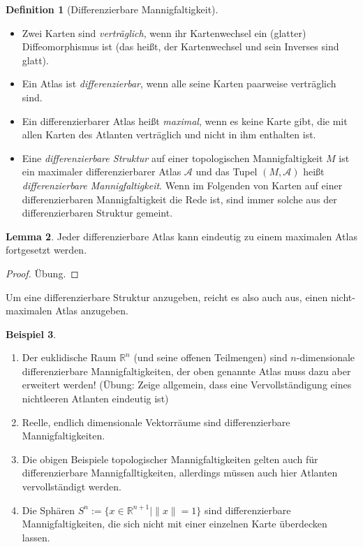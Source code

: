 \documentclass[a4paper]{scrreprt}
\numberwithin{equation}{chapter}
\newcommand{\R}{\mathbb{R}}
\theoremstyle{definition}
\newtheorem{defn}{Definition}[section]
\newtheorem{lemma}[defn]{Lemma}
\newtheorem{bsp}[defn]{Beispiel}
\newcommand{\bewUeb}{\begin{proof}Übung.\end{proof}}
\begin{document}
		\begin{defn}[Differenzierbare Mannigfaltigkeit]\hfill
			\begin{itemize}
				\item Zwei Karten sind \emph{verträglich}, wenn ihr Kartenwechsel ein (glatter) Diffeomorphismus ist (das heißt, der Kartenwechsel und sein Inverses sind glatt).
				\item Ein Atlas ist \emph{differenzierbar}, wenn alle seine Karten paarweise verträglich sind.
				\item Ein differenzierbarer Atlas heißt \emph{maximal}, wenn es keine Karte gibt, die mit allen Karten des Atlanten verträglich und nicht in ihm enthalten ist.
				\item Eine \emph{differenzierbare Struktur} auf einer topologischen Mannigfaltigkeit $M$ ist ein maximaler differenzierbarer Atlas $\mathcal{A}$ und das Tupel $(M,\mathcal{A})$ heißt \emph{differenzierbare Mannigfaltigkeit}. Wenn im Folgenden von Karten auf einer differenzierbaren Mannigfaltigkeit die Rede ist, sind immer solche aus der differenzierbaren Struktur gemeint.
			\end{itemize}
		\end{defn}
		\begin{lemma}
			Jeder differenzierbare Atlas kann eindeutig zu einem maximalen Atlas fortgesetzt werden. \bewUeb
		\end{lemma}
		Um eine differenzierbare Struktur anzugeben, reicht es also auch aus, einen nicht-maximalen Atlas anzugeben.
		\begin{bsp}\hfill 
			\begin{enumerate}
				\item Der euklidische Raum $\R^n$ (und seine offenen Teilmengen) sind $n$-dimensionale differenzierbare Mannigfaltigkeiten, der oben genannte Atlas muss dazu aber erweitert werden! (Übung: Zeige allgemein, dass eine Vervollständigung eines nichtleeren Atlanten eindeutig ist)
				\item Reelle, endlich dimensionale Vektorräume sind differenzierbare Mannigfaltigkeiten.
				\item Die obigen Beispiele topologischer Mannigfaltigkeiten gelten auch für differenzierbare Mannigfalltigkeiten, allerdings müssen auch hier Atlanten vervollständigt werden.
				\item Die Sphären ${S^n:=\lbrace x\in\R^{n+1}\mid \|x\|=1\rbrace}$ sind differenzierbare Mannigfaltigkeiten, die sich nicht mit einer einzelnen Karte überdecken lassen.
			\end{enumerate}
		\end{bsp}
\end{document}
